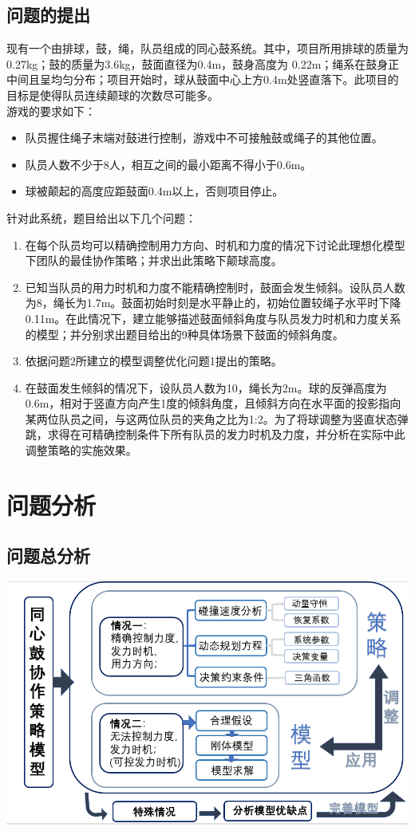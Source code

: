 \documentclass[withoutpreface,bwprint]{cumcmthesis}
\begin{document}
\subsection{问题的提出}
现有一个由排球，鼓，绳，队员组成的同心鼓系统。其中，项目所用排球的质量为0.27kg；鼓的质量为3.6kg，鼓面直径为0.4m，鼓身高度为 0.22m；绳系在鼓身正中间且呈均匀分布；项目开始时，球从鼓面中心上方0.4m处竖直落下。此项目的目标是使得队员连续颠球的次数尽可能多。\\
游戏的要求如下：
\begin{itemize}
	\item 队员握住绳子末端对鼓进行控制，游戏中不可接触鼓或绳子的其他位置。
	\item 队员人数不少于8人，相互之间的最小距离不得小于0.6m。
	\item 球被颠起的高度应距鼓面0.4m以上，否则项目停止。
\end{itemize}
针对此系统，题目给出以下几个问题：
\begin{enumerate}
	\item 在每个队员均可以精确控制用力方向、时机和力度的情况下讨论此理想化模型下团队的最佳协作策略；并求出此策略下颠球高度。
	\item 已知当队员的用力时机和力度不能精确控制时，鼓面会发生倾斜。设队员人数为8，绳长为1.7m。鼓面初始时刻是水平静止的，初始位置较绳子水平时下降0.11m。在此情况下，建立能够描述鼓面倾斜角度与队员发力时机和力度关系的模型；并分别求出题目给出的9种具体场景下鼓面的倾斜角度。
	\item 依据问题2所建立的模型调整优化问题1提出的策略。
	\item 在鼓面发生倾斜的情况下，设队员人数为10，绳长为2m。球的反弹高度为0.6m，相对于竖直方向产生1度的倾斜角度，且倾斜方向在水平面的投影指向某两位队员之间，与这两位队员的夹角之比为1:2。为了将球调整为竖直状态弹跳，求得在可精确控制条件下所有队员的发力时机及力度，并分析在实际中此调整策略的实施效果。
\end{enumerate}

\section{问题分析}
\subsection{问题总分析}
\begin{center}
	\includegraphics[scale = 0.57]{lc.png}
\end{center}
\end{document}

